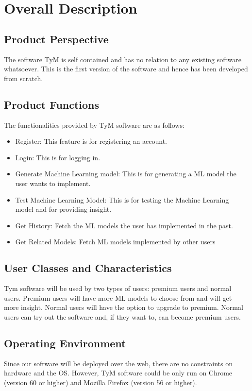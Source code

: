 \documentclass{scrreprt}
\begin{document}
\chapter{Overall Description}

\section{Product Perspective}
The software TyM is self contained and has no relation to any existing software whatsoever. This is the first version of the software and hence has been developed from scratch.

\section{Product Functions}
The functionalities provided by TyM software are as follows: 
\begin{itemize}
\item Register: This feature is for registering an account.
\item Login: This is for logging in.
\item Generate Machine Learning model: This is for generating a ML model the user wants to implement.
\item Test Machine Learning Model: This is for testing the Machine Learning model and for providing insight.
\item Get History: Fetch the ML models the user has implemented in the past.
\item Get Related Models: Fetch ML models implemented by other users 
\end{itemize}

\section{User Classes and Characteristics}
Tym software will be used by two types of users: premium users and normal users. Premium users will have more ML models to choose from and will get more insight. Normal users will have the option to upgrade to premium. Normal users can try out the software and, if they want to, can become premium users.

\section{Operating Environment}
Since our software will be deployed over the web, there are no constraints on hardware and the OS. However, TyM software could be only run on Chrome (version 60 or higher) and Mozilla Firefox (version 56 or higher).
\end{document}
